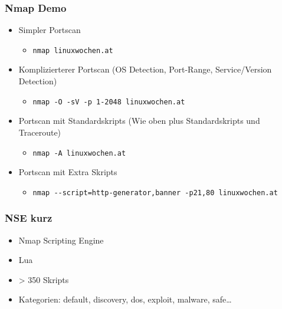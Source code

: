 \documentclass[11pt]{beamer}
\begin{document}
\begin{frame}[fragile]\frametitle{Nmap Demo}
\label{sec-2-3}
\begin{itemize}

\item Simpler Portscan
\label{sec-2-3-1}%
\begin{itemize}

\item \texttt{nmap linuxwochen.at}\\
\label{sec-2-3-1-1}%
\end{itemize} %

\item Komplizierterer Portscan (OS Detection, Port-Range, Service/Version Detection)
\label{sec-2-3-2}%
\begin{itemize}

\item \texttt{nmap -O -sV -p 1-2048 linuxwochen.at}\\
\label{sec-2-3-2-1}%
\end{itemize} %

\item Portscan mit Standardskripts (Wie oben plus Standardskripts und Traceroute)
\label{sec-2-3-3}%
\begin{itemize}

\item \texttt{nmap -A linuxwochen.at}\\
\label{sec-2-3-3-1}%
\end{itemize} %

\item Portscan mit Extra Skripts
\label{sec-2-3-4}%
\begin{itemize}

\item \texttt{nmap -{}-script=http-generator,banner -p21,80 linuxwochen.at}\\
\label{sec-2-3-4-1}%
\end{itemize} %
\end{itemize} %
\end{frame}
\begin{frame}[fragile]\frametitle{NSE kurz}
\label{sec-2-4}
\begin{itemize}

\item Nmap Scripting Engine\\
\label{sec-2-4-1}%
\item Lua\\
\label{sec-2-4-2}%
\item > 350 Skripts\\
\label{sec-2-4-3}%
\item Kategorien: default, discovery, dos, exploit, malware, safe\ldots{}\\
\label{sec-2-4-4}%
\end{itemize} %
\end{frame}
\end{document}
